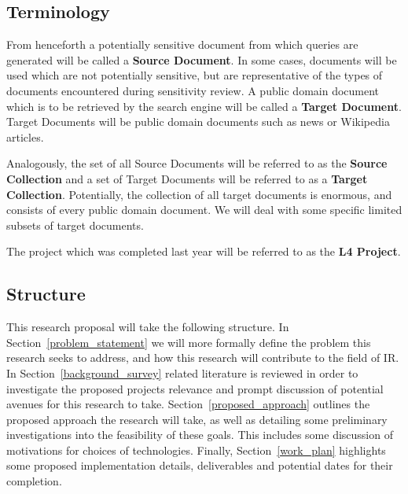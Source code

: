 \documentclass{mprop}
\begin{document}
\subsection{Terminology}
From henceforth a potentially sensitive document from which queries are generated will be called a \textbf{Source Document}.
In some cases, documents will be used which are not potentially sensitive, but are representative of the types of documents encountered during  sensitivity review.
A public domain document which is to be retrieved by the search engine will be called a \textbf{Target Document}.
Target Documents will be public domain documents such as news or Wikipedia articles.

Analogously, the set of all Source Documents will be referred to as the \textbf{Source Collection} and a set of Target Documents will be referred to as a \textbf{Target Collection}.
Potentially, the collection of all target documents is enormous, and consists of every public domain document. We will deal with some specific limited subsets of target documents.

The project which was completed last year will be referred to as the \textbf{L4 Project}.

\subsection{Structure}
This research proposal will take the following structure. 
In Section~\ref{problem_statement} we will more formally define the problem this research seeks to address, and how this research will contribute to the field of IR. 
In Section~\ref{background_survey} related literature is reviewed in order to investigate the proposed projects relevance and prompt discussion of potential avenues for this research to take. 
Section~\ref{proposed_approach} outlines the proposed approach the research will take, as well as detailing some preliminary investigations into the feasibility of these goals. 
This includes some discussion of motivations for choices of technologies.
Finally, Section~\ref{work_plan} highlights some proposed implementation details, deliverables and potential dates for their completion.

\end{document}

